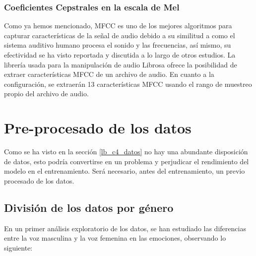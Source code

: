 \documentclass[11pt,a4paper,spanish]{book}
\begin{document}
	\subsubsection{Coeficientes Cepstrales en la escala de Mel}
	Como ya hemos mencionado, MFCC es uno de los mejores algoritmos para capturar características de la señal de audio debido a su similitud a como el sistema auditivo humano procesa el sonido y las frecuencias, así mismo, su efectividad se ha visto reportada y discutida a lo largo de otros estudios.
	La librería usada para la manipulación de audio Librosa ofrece la posibilidad de extraer características MFCC de un archivo de audio. En cuanto a la configuración, se extraerán 13 características MFCC usando el rango de muestreo propio del archivo de audio.

	
	
	\section{Pre-procesado de los datos}
	Como se ha visto en la sección \ref{lb_c4_datos} no hay una abundante disposición de datos, esto podría convertirse en un problema y perjudicar el rendimiento del modelo en el entrenamiento. 
	Será necesario, antes del entrenamiento, un previo procesado de los datos.
	
	\subsection{División de los datos por género}
	En un primer análisis exploratorio de los datos, se han estudiado las diferencias entre la voz masculina y la voz femenina en las emociones, observando lo siguiente:
	
\end{document}

